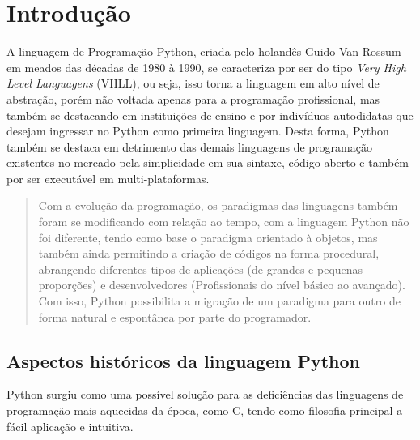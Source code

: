 


\chapter{ Introdu\c{c}\~{a}o}

A linguagem de Programação Python, criada pelo holandês Guido Van Rossum em meados das décadas de 1980 à 1990, se caracteriza por ser do tipo \textit{Very High Level Languagens} (VHLL), ou seja, isso torna a linguagem em alto nível de abstração, porém não voltada apenas para a programação profissional, mas também se destacando em instituições de ensino e por indivíduos autodidatas que desejam ingressar no Python como primeira linguagem. Desta forma, Python também se destaca em detrimento das demais linguagens de programação existentes no mercado pela simplicidade em sua sintaxe, código aberto e também por ser executável em multi-plataformas.
\begin{quote}
Com a evolução da programação, os paradigmas das linguagens também foram se modificando com relação ao tempo, com a linguagem Python não foi diferente, tendo como base o paradigma orientado à objetos, mas também ainda permitindo a criação de códigos na forma procedural, abrangendo diferentes tipos de aplicações (de grandes e pequenas proporções) e desenvolvedores (Profissionais do nível básico ao avançado). Com isso, Python possibilita a migração de um paradigma para outro de forma natural e espontânea por parte do programador.
\end{quote}


   \section{Aspectos hist\'{o}ricos da linguagem Python}
Python surgiu como uma possível solução para as deficiências das linguagens de programação mais aquecidas da época, como C, tendo como filosofia principal a fácil aplicação e intuitiva.   

